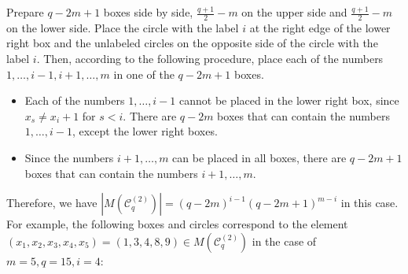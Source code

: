 \documentclass{article}
\theoremstyle{plain}
\theoremstyle{definition}
\theoremstyle{remark}
\numberwithin{equation}{section}
\newcommand{\Cc}{\mathcal{C}}
\begin{document}
Prepare $q-2m+1$ boxes side by side, $\displaystyle \frac{q+1}{2}-m$ on the upper side and $\displaystyle \frac{q+1}{2}-m$ on the lower side.
Place the circle with the label $i$ at the right edge of the lower right box and the unlabeled circles on the opposite side of the circle with the label $i$.
Then, according to the following procedure, place each of the numbers $1,\dots,i-1,i+1,\dots,m$ in one of the $q-2m+1$ boxes.
\begin{itemize}
\item Each of the numbers $1,\dots,i-1$ cannot be placed in the lower right box, since $x_s\neq x_i+1$ for $s<i$.
There are $q-2m$ boxes that can contain the numbers $1,\dots,i-1$, except the lower right boxes.

\item Since the numbers $i+1,\dots,m$ can be placed in all boxes, there are $q-2m+1$ boxes that can contain the numbers $i+1,\dots,m$.
\end{itemize}
Therefore, we have $|M(\Cc^{(2)}_q)|=(q-2m)^{i-1}(q-2m+1)^{m-i}$ in this case.
For example, the following boxes and circles correspond to the element $(x_1,x_2,x_3,x_4,x_5)=(1,3,4,8,9)\in M(\Cc^{(2)}_q)$ in the case of $m=5,q=15,i=4$:
\begin{center}
\end{center}
\end{document}
